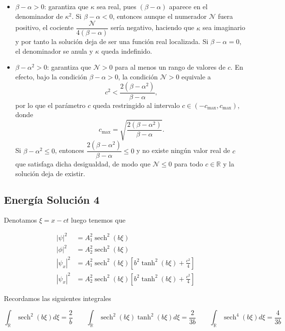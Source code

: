 \documentclass[letterpaper,11pt]{exam}
\newcommand{\R}{\mathbb R}
\newcommand{\sech}{\operatorname{sech}}
\theoremstyle{plain}
\begin{document}
\begin{itemize}
    \item $\beta - \alpha > 0$: garantiza que $\kappa$ sea real, pues $(\beta-\alpha)$ aparece en el denominador de $\kappa^2$. Si $\beta - \alpha < 0$, entonces aunque el numerador $\mathcal{N}$ fuera positivo, el cociente $\dfrac{\mathcal{N}}{4(\beta-\alpha)}$ sería negativo, haciendo que $\kappa$ sea imaginario y por tanto la solución deja de ser una función real localizada. Si $\beta - \alpha = 0$, el denominador se anula y $\kappa$ queda indefinido.
    
    \item $\beta - \alpha^2 > 0$: garantiza que $\mathcal{N} > 0$ para al menos un rango de valores de $c$. En efecto, bajo la condición $\beta - \alpha > 0$, la condición $\mathcal{N} > 0$ equivale a
    \begin{equation*}
        c^2 < \frac{2(\beta-\alpha^2)}{\beta-\alpha},
    \end{equation*}
    por lo que el parámetro $c$ queda restringido al intervalo $c \in (-c_{\max}, c_{\max})$, donde
    \begin{equation*}
        c_{\max} = \sqrt{\frac{2(\beta-\alpha^2)}{\beta-\alpha}}.
    \end{equation*}
    Si $\beta - \alpha^2 \leq 0$, entonces $\dfrac{2(\beta-\alpha^2)}{\beta-\alpha} \leq 0$ y no existe ningún valor real de $c$ que satisfaga dicha desigualdad, de modo que $\mathcal{N} \leq 0$ para todo $c \in \mathbb{R}$ y la solución deja de existir.
\end{itemize}

\subsection{Energía Solución 4}

Denotamos $ \xi =x-ct$ luego tenemos que 

\begin{align*}
    |\psi|^2 &=A_1^2\sech^2(b\xi) \\
    |\phi|^2 &=A_2^2\sech^2(b\xi) \\
    |\psi_x|^2 &= A_1^2\sech^2(b\xi)\left [b^2\tanh^2(b\xi)+\frac{c^2}{4} \right] \\
    |\psi_x|^2 &= A_2^2\sech^2(b\xi)\left [b^2\tanh^2(b\xi)+\frac{c^2}{4} \right]
\end{align*}

Recordamos las siguientes integrales 

\begin{equation*}
  \int_\R \sech^2(b\xi)d\xi =\frac{2}{b} \qquad \int_\R \sech^2(b\xi)\tanh ^2(b\xi)d\xi =\frac{2}{3b} \qquad \int_\R \sech^4(b\xi)d\xi =\frac{4}{3b}
\end{equation*}
\end{document}
